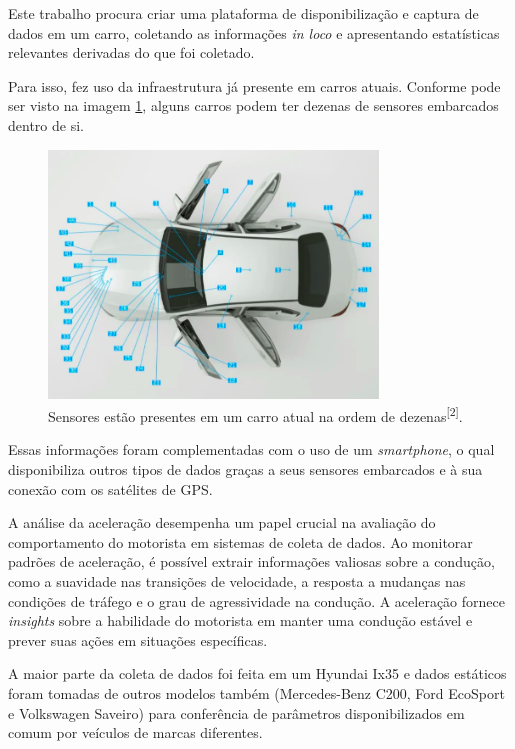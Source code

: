 Este trabalho procura criar uma plataforma de disponibilização e captura de dados em um carro, coletando as informações \textit{in loco} e apresentando estatísticas relevantes derivadas do que foi coletado.

Para isso, fez uso da infraestrutura já presente em carros atuais. Conforme pode ser visto na imagem \ref{fig:sensors_car}, alguns carros podem ter dezenas de sensores embarcados dentro de si.


\begin{figure}[hp]
    \centering
    
    \includegraphics[]{figures/sensores_carro.png}
    
    \caption{Sensores estão presentes em um carro atual na ordem de dezenas\textsuperscript{[2]}.}
    
    \label{fig:sensors_car}
\end{figure}

Essas informações foram complementadas com o uso de um \textit{smartphone}, o qual disponibiliza outros tipos de dados graças a seus sensores embarcados e à sua conexão com os satélites de GPS.

A análise da aceleração desempenha um papel crucial na avaliação do comportamento do motorista em sistemas de coleta de dados. Ao monitorar padrões de aceleração, é possível extrair informações valiosas sobre a condução, como a suavidade nas transições de velocidade, a resposta a mudanças nas condições de tráfego e o grau de agressividade na condução. A aceleração fornece \textit{insights} sobre a habilidade do motorista em manter uma condução estável e prever suas ações em situações específicas. 

A maior parte da coleta de dados foi feita em um Hyundai Ix35 e dados estáticos foram tomadas de outros modelos também (Mercedes-Benz C200, Ford EcoSport e Volkswagen Saveiro) para conferência de parâmetros disponibilizados em comum por veículos de marcas diferentes.

